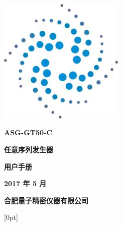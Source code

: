 \documentclass[openany,a4paper,UTF-8]{book}
\begin{document}
\begin{titlepage}
\begin{center}
\includegraphics[width=6cm]{logo}

\Huge\textbf{ASG-GT50-C}

\vspace{0.7cm}
\Huge\heiti\textbf{任意序列发生器}

\vspace{0.7cm}
\Huge\heiti\textbf{用户手册}

\vspace{8cm}
\Huge\heiti \textbf{2017 年 5 月}

\Huge\heiti\textbf{合肥量子精密仪器有限公司}
\end{center}
\end{titlepage}
\newpage
\qquad
\thispagestyle{empty}
\newpage
\thispagestyle{empty}




\newpage
{}[0pt]{\vspace{3mm}\bf\addvspace{2pt}\filright}
              {\contentspush{\thecontentslabel\hspace{0.8em}}}
              {}{\contentspage}
\tableofcontents
\thispagestyle{empty}
\newpage
\qquad








\end{document}
